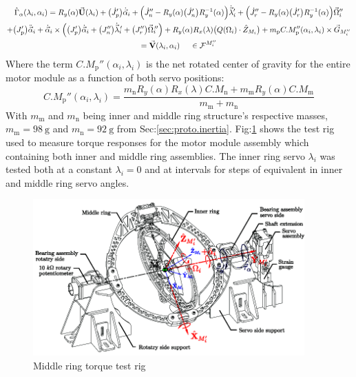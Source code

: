 \begin{multline} \label{eq:model-middle}
\hat{\Gamma}_\alpha(\lambda_i,\alpha_i)=R_y(\alpha)\vec{\mathbf{U}}(\lambda_i)+\big(\dot{J}_p'\big)\dot{\vec{\alpha}}_i+\Big(\dot{J}_n''-R_y(\alpha)\big(\dot{J}_n'\big)R_y^{-1}(\alpha)\Big)\dot{\vec{\lambda}}_i'+\Big(\dot{J}_r''-R_y(\alpha)\big(\dot{J}_r'\big)R_y^{-1}(\alpha)\Big)\vec{\Omega}_i''
\\
+\big(J_\text{p}'\big)\ddot{\vec{\alpha}}_i+\dot{\vec{\alpha}}_i\times \Big(\big(J_p'\big)\dot{\vec{\alpha}}_i+\big(J_n''\big)\dot{\vec{\lambda}}_i\hspace{-2pt}'+\big(J_r''\big)\vec{\Omega}_i\hspace{-2pt}''\Big)+R_y(\alpha)R_x(\lambda)\big(Q(\Omega_i)\cdot\hat{Z}_{M_i}\big)+m_\text{p}C.M''_{\text{p}}(\alpha_i,\lambda_i)\times\vec{G}_{M_i''}
\\
=\vec{\mathbf{V}}(\lambda_i,\alpha_i)~~~~\in\mathcal{F}^{M_i''}
\end{multline}
Where the term $C.M_{\text{p}}''(\alpha_i,\lambda_i)$ is the net rotated center of gravity for the entire motor module as a function of both servo positions:
\begin{equation}
C.M_\text{p}''(\alpha_i,\lambda_i)=\frac{m_\text{n}R_y(\alpha)R_x(\lambda)C.M_\text{n}+m_\text{m}R_y(\alpha)C.M_\text{m}}{m_\text{m}+m_\text{n}}
\end{equation}
With $m_\text{m}$ and $m_\text{n}$ being inner and middle ring structure's respective masses, $m_\text{m}=98~\text{g}$ and $m_\text{n}=92~\text{g}$ from Sec:\ref{sec:proto.inertia}.
Fig:\ref{fig:torque-middle} shows the test rig used to measure torque responses for the motor module assembly which containing both inner and middle ring assemblies. The inner ring servo $\lambda_i$ was tested both at a constant $\lambda_i=0$ and at intervals for steps of equivalent in inner and middle ring servo angles.
\par
\begin{figure}[htbp]
\centering
\includegraphics[width=0.93\textwidth]{figs/torque-middle}
\vspace{-10pt}
\caption{Middle ring torque test rig}
\label{fig:torque-middle}
\vspace{-16pt}
\end{figure}

